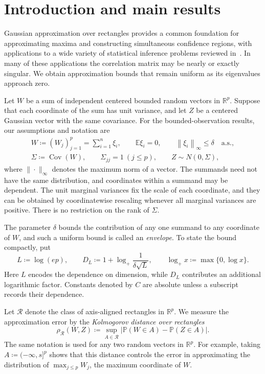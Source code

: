 \documentclass[11pt,letterpaper]{article}
\theoremstyle{remark}
\newcommand{\E}{\mathbb E}
\newcommand{\Pp}{\mathbb P}
\newcommand{\R}{\mathbb R}
\newcommand{\Cov}{\operatorname{Cov}}
\newcommand{\norm}[1]{\left\lVert#1\right\rVert}
\newcommand{\rh}{\rho_{\mathcal R}}
\begin{document}
\clearpage
\begingroup
\small
\linespread{0.96}\selectfont
\tableofcontents
\endgroup
\clearpage

\section{\texorpdfstring{Introduction and main results}{Introduction and main results}}\label{sec:results}
Gaussian approximation over rectangles provides a common foundation for
approximating maxima and constructing simultaneous confidence regions, with
applications to a wide variety of statistical inference problems reviewed in~\cite{CCKK2023}.
In many of these applications the correlation matrix may be nearly or
exactly singular. We obtain approximation bounds that remain uniform
as its eigenvalues approach zero.

Let \(W\) be a sum of independent centered bounded random vectors in
\(\R^p\). Suppose that each coordinate of the sum has unit variance,
and let \(Z\) be a centered Gaussian vector with the same covariance.
For the bounded-observation results, our assumptions and notation are
\begin{equation}
 \begin{gathered}
 W\coloneqq (W_j)_{j=1}^p=\sum_{i=1}^n\xi_i,\qquad
 \E\xi_i=0,\qquad \norm{\xi_i}_\infty\le\delta\quad\text{a.s.},\\
 \Sigma\coloneqq \Cov(W),\qquad\Sigma_{jj}=1\ (j\le p),
 \qquad Z\sim N(0,\Sigma),
 \end{gathered}
 \label{eq:setup}
\end{equation}
where $\|\cdot\|_\infty$ denotes the maximum norm of a vector. 
The summands need not have the same distribution, and coordinates within
a summand may be dependent. The unit marginal variances fix the scale
of each coordinate, and they can be obtained by coordinatewise rescaling
whenever all marginal variances are positive. There is no
restriction on the rank of \(\Sigma\).

The parameter \(\delta\) bounds the contribution of any one summand
to any coordinate of \(W\), and such a uniform bound is called an
\emph{envelope}. To state the
bound compactly, put
\[
 L\coloneqq \log(ep),\qquad
 D_L\coloneqq 1+\log_+\frac1{\delta\sqrt L},\qquad
 \log_+x\coloneqq \max\{0,\log x\}.
\]
Here \(L\) encodes the dependence on dimension, while \(D_L\)
contributes an additional logarithmic factor. Constants denoted by
\(C\) are absolute unless a subscript records their dependence.

Let \(\mathcal R\) denote the class of axis-aligned rectangles in
\(\R^p\). We measure the approximation error by the \emph{Kolmogorov distance over rectangles}
\[
 \rh(W,Z)\coloneqq \sup_{A\in\mathcal R}
       |\Pp(W\in A)-\Pp(Z\in A)|.
\]
The same notation is used for any two random vectors in \(\R^p\). For
example, taking \(A\coloneqq (-\infty,s]^p\) shows that this distance controls the
error in approximating the distribution of \(\max_{j\le p}W_j\), the maximum
coordinate of \(W\).
\end{document}
